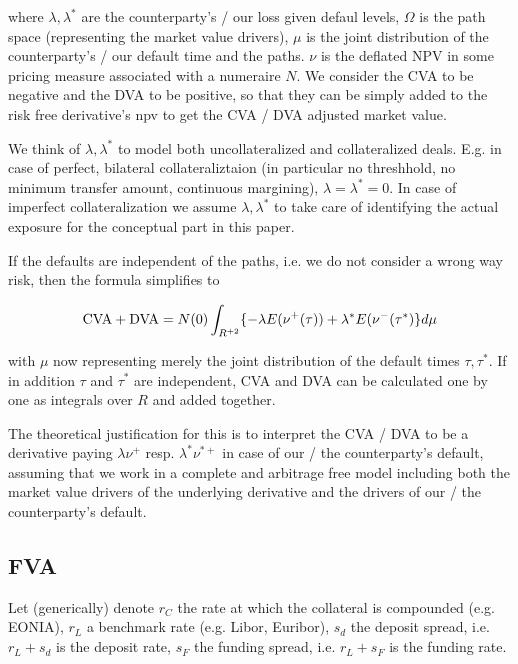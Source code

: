 \documentclass{amsart}
\theoremstyle{plain}
\numberwithin{equation}{section}
\begin{document}
where $\lambda, \lambda^*$ are the counterparty's / our loss given defaul levels, $\Omega$ is the path space (representing the market value drivers), $\mu$ is the joint distribution of the counterparty's / our default time and the paths. $\nu$ is the deflated NPV in some pricing measure associated with a numeraire $N$. We consider the CVA to be negative and the DVA to be positive, so that they can be simply added to the risk free derivative's npv to get the CVA / DVA adjusted market value.

We think of $\lambda, \lambda^*$ to model both uncollateralized and collateralized deals. E.g. in case of perfect, bilateral collateraliztaion (in particular no threshhold, no minimum transfer amount, continuous margining), $\lambda = \lambda^* = 0$. In case of imperfect collateralization we assume $\lambda, \lambda^*$ to take care of identifying the actual exposure for the conceptual part in this paper.

If the defaults are independent of the paths, i.e. we do not consider a wrong way risk, then the formula simplifies to

\begin{equation}
\textnormal{CVA} + \textnormal{DVA} = N(0) \int_{R^{+2}} \{ -\lambda E(\nu^+(\tau)) + \lambda^* E(\nu^-(\tau^*) \} d\mu 
\end{equation}

with $\mu$ now representing merely the joint distribution of the default times $\tau, \tau^*$. If in addition $\tau$ and $\tau^*$ are independent, CVA and DVA can be calculated one by one as integrals over $R$ and added together.

The theoretical justification for this is to interpret the CVA / DVA to be a derivative paying $\lambda \nu^+$ resp. $\lambda^* \nu^{*+}$ in case of our / the counterparty's default, assuming that we work in a complete and arbitrage free model including both the market value drivers of the underlying derivative and the drivers of our / the counterparty's default.

\subsection{FVA}

Let (generically) denote $r_C$ the rate at which the collateral is compounded (e.g. EONIA), $r_L$ a benchmark rate (e.g. Libor, Euribor), $s_d$ the deposit spread, i.e. $r_L+s_d$ is the deposit rate, $s_F$ the funding spread, i.e. $r_L+s_F$ is the funding rate.
\end{document}
